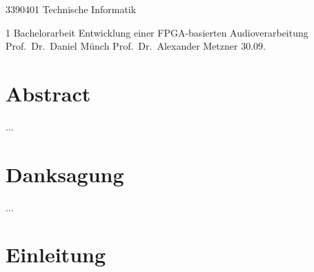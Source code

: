 \documentclass[12pt,a4paper,bibliography=totoc,listof=totoc]{scrartcl}
\begin{document}
{3390401}
{Technische Informatik}

\MyTitelseite{}
{1}
{Bachelorarbeit}
{Entwicklung einer FPGA-basierten Audioverarbeitung}
{Prof.\ Dr.\ Daniel Münch}
{Prof.\ Dr.\ Alexander Metzner}
{30.09.\the\year}

\setcounter{page}{1}

\section*{Abstract}
...
\pagebreak

\section*{Danksagung}
...
\pagebreak

\tableofcontents
\pagebreak

\setcounter{page}{1}

\section{Einleitung}

\pagebreak

\end{document}
